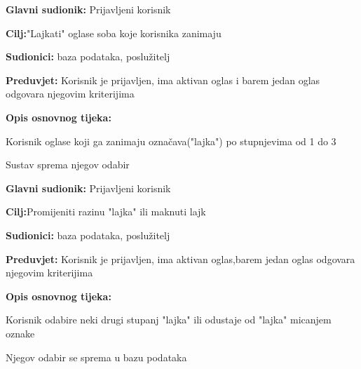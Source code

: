 \noindent {}
\begin{packed_item}
	
	\item \textbf{Glavni sudionik: }Prijavljeni korisnik
	\item  \textbf{Cilj:}"Lajkati" oglase soba koje korisnika zanimaju
	\item  \textbf{Sudionici:} baza podataka, poslužitelj
	\item  \textbf{Preduvjet:} Korisnik je prijavljen, ima aktivan oglas i barem jedan oglas odgovara njegovim kriterijima
	\item  \textbf{Opis osnovnog tijeka:}
	
	\item[] \begin{packed_enum}
		
		\item Korisnik oglase koji ga zanimaju označava("lajka") po stupnjevima od 1 do 3
		\item Sustav sprema njegov odabir
	\end{packed_enum}
	
\end{packed_item}

\noindent {}
\begin{packed_item}
	
	\item \textbf{Glavni sudionik: }Prijavljeni korisnik
	\item  \textbf{Cilj:}Promijeniti razinu "lajka" ili maknuti lajk
	\item  \textbf{Sudionici:} baza podataka, poslužitelj
	\item  \textbf{Preduvjet:} Korisnik je prijavljen, ima aktivan oglas,barem jedan oglas odgovara njegovim kriterijima
	\item  \textbf{Opis osnovnog tijeka:}
	
	\item[] \begin{packed_enum}
		
		\item Korisnik odabire neki drugi stupanj "lajka" ili odustaje od "lajka" micanjem oznake
		\item Njegov odabir se sprema u bazu podataka
		
	\end{packed_enum}
	
\end{packed_item}

